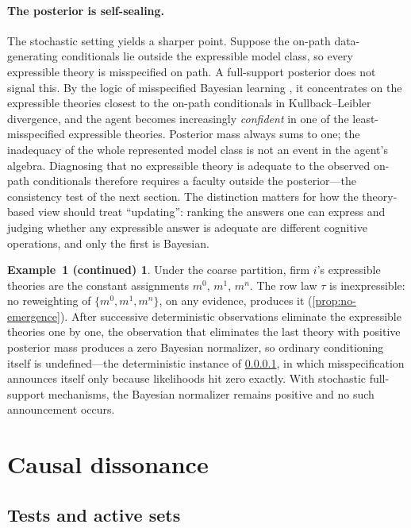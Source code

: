 \documentclass[11pt]{article}
\theoremstyle{definition}
\newtheorem*{excont}{Example~1 (continued)}
\begin{document}
\paragraph{The posterior is self-sealing.}
\label{rem:self-sealing}
The stochastic setting yields a sharper point.
Suppose the on-path data-generating conditionals lie outside the expressible model class, so every expressible theory is misspecified on path.
A full-support posterior does not signal this.
By the logic of misspecified Bayesian learning \citep{Berk1966}, it concentrates on the expressible theories closest to the on-path conditionals in Kullback--Leibler divergence, and the agent becomes increasingly \emph{confident} in one of the least-misspecified expressible theories.
Posterior mass always sums to one; the inadequacy of the whole represented model class is not an event in the agent's algebra.
Diagnosing that no expressible theory is adequate to the observed on-path conditionals therefore requires a faculty outside the posterior---the consistency test of the next section.
The distinction matters for how the theory-based view should treat ``updating'': ranking the answers one can express and judging whether any expressible answer is adequate are different cognitive operations, and only the first is Bayesian.

\begin{excont}
Under the coarse partition, firm $i$'s expressible theories are the constant assignments $m^0$, $m^1$, $m^n$.
The row law $\tau$ is inexpressible: no reweighting of $\{m^0,m^1,m^n\}$, on any evidence, produces it (\cref{prop:no-emergence}).
After successive deterministic observations eliminate the expressible theories one by one, the observation that eliminates the last theory with positive posterior mass produces a zero Bayesian normalizer, so ordinary conditioning itself is undefined---the deterministic instance of \cref{rem:self-sealing}, in which misspecification announces itself only because likelihoods hit zero exactly.
With stochastic full-support mechanisms, the Bayesian normalizer remains positive and no such announcement occurs.
\end{excont}
\section{Causal dissonance}
\label{sec:dissonance}

\subsection{Tests and active sets}
\end{document}
